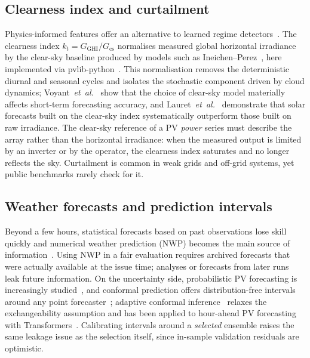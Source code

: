 \subsection{Clearness index and curtailment}
\label{subsec:rw_kt}

Physics-informed features offer an alternative to learned regime
detectors~\cite{pombo2022benchmarking,mayer2021extensive}. The
clearness index \(k_t = G_\mathrm{GHI}/G_\mathrm{cs}\) normalises
measured global horizontal irradiance by the clear-sky baseline
produced by models such as Ineichen--Perez~\cite{ineichen2002broadband},
here implemented via pvlib-python~\cite{holmgren2018pvlib}. This
normalisation removes the deterministic diurnal and seasonal cycles
and isolates the stochastic component driven by cloud dynamics;
Voyant~\textit{et~al.}~\cite{voyant2025importance} show that the
choice of clear-sky model materially affects short-term forecasting
accuracy, and Lauret~\textit{et~al.}~\cite{lauret2022forecasts}
demonstrate that solar forecasts built on the clear-sky index
systematically outperform those built on raw irradiance. The clear-sky reference of a PV
\emph{power} series must describe the array rather than the horizontal
irradiance: when the measured output is limited by an inverter or by
the operator, the clearness index saturates and no longer reflects the
sky. Curtailment is common in weak grids and off-grid systems, yet
public benchmarks rarely check for it.

\subsection{Weather forecasts and prediction intervals}
\label{subsec:rw_nwp}

Beyond a few hours, statistical forecasts based on past observations
lose skill quickly and numerical weather prediction (NWP) becomes the
main source of information~\cite{mayer2021extensive,pombo2022benchmarking}.
Using NWP in a fair evaluation requires archived forecasts that were
actually available at the issue time; analyses or forecasts from later
runs leak future information. On the uncertainty side, probabilistic
PV forecasting is increasingly
studied~\cite{xiong2025probabilistic}, and conformal prediction offers
distribution-free intervals around any point
forecaster~\cite{vovk2005algorithmic,barber2021jackknife}; adaptive
conformal inference~\cite{gibbs2021adaptive} relaxes the
exchangeability assumption and has been applied to hour-ahead PV
forecasting with Transformers~\cite{suresh2025benchmarking}. Calibrating
intervals around a \emph{selected} ensemble raises the same leakage
issue as the selection itself, since in-sample validation residuals
are optimistic.

